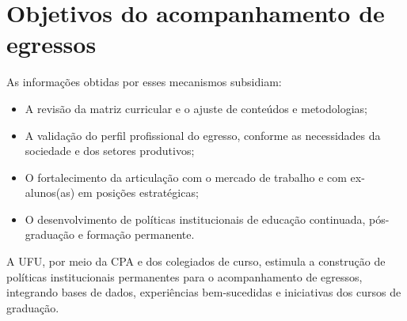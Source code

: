 \section{Objetivos do acompanhamento de egressos}

As informações obtidas por esses mecanismos subsidiam:

\begin{itemize}
    \item A revisão da matriz curricular e o ajuste de conteúdos e metodologias;
    \item A validação do perfil profissional do egresso, conforme as necessidades da sociedade e dos setores produtivos;
    \item O fortalecimento da articulação com o mercado de trabalho e com ex-alunos(as) em posições estratégicas;
    \item O desenvolvimento de políticas institucionais de educação continuada, pós-graduação e formação permanente.
\end{itemize}

A UFU, por meio da CPA e dos colegiados de curso, estimula a construção de políticas institucionais permanentes para o acompanhamento de egressos, integrando bases de dados, experiências bem-sucedidas e iniciativas dos cursos de graduação.